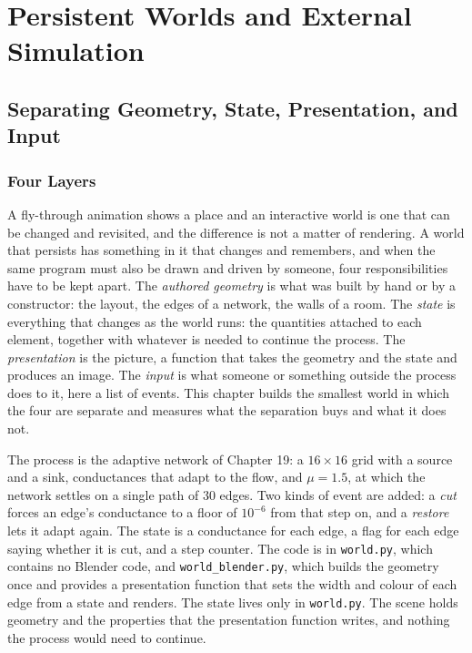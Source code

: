 \part{Persistent Worlds and External Simulation}

\chapter{Separating Geometry, State, Presentation, and Input}

\section{Four Layers}

A fly-through animation shows a place and an interactive world is one that can be changed and revisited, and the difference is not a matter of rendering. A world that persists has something in it that changes and remembers, and when the same program must also be drawn and driven by someone, four responsibilities have to be kept apart. The \emph{authored geometry} is what was built by hand or by a constructor: the layout, the edges of a network, the walls of a room. The \emph{state} is everything that changes as the world runs: the quantities attached to each element, together with whatever is needed to continue the process. The \emph{presentation} is the picture, a function that takes the geometry and the state and produces an image. The \emph{input} is what someone or something outside the process does to it, here a list of events. This chapter builds the smallest world in which the four are separate and measures what the separation buys and what it does not.

The process is the adaptive network of Chapter 19: a $16\times16$ grid with a source and a sink, conductances that adapt to the flow, and $\mu=1.5$, at which the network settles on a single path of $30$ edges. Two kinds of event are added: a \emph{cut} forces an edge's conductance to a floor of $10^{-6}$ from that step on, and a \emph{restore} lets it adapt again. The state is a conductance for each edge, a flag for each edge saying whether it is cut, and a step counter. The code is in \texttt{world.py}, which contains no Blender code, and \texttt{world\_blender.py}, which builds the geometry once and provides a presentation function that sets the width and colour of each edge from a state and renders. The state lives only in \texttt{world.py}. The scene holds geometry and the properties that the presentation function writes, and nothing the process would need to continue.

